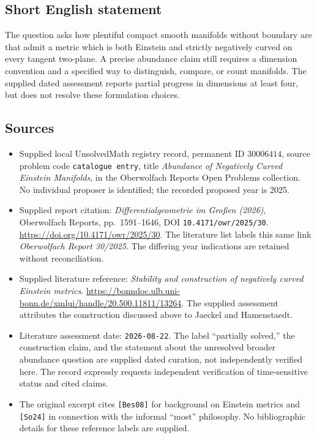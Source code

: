 \documentclass[11pt]{article}
\begin{document}
\subsection{Short English statement}
The question asks how plentiful compact smooth manifolds without boundary are that admit a metric which is both Einstein and strictly negatively curved on every tangent two-plane. A precise abundance claim still requires a dimension convention and a specified way to distinguish, compare, or count manifolds. The supplied dated assessment reports partial progress in dimensions at least four, but does not resolve these formulation choices.
\subsection{Sources}
\begin{itemize}
\item Supplied local UnsolvedMath registry record, permanent ID \(30006414\), source problem code \texttt{catalogue entry}, title \emph{Abundance of Negatively Curved Einstein Manifolds}, in the Oberwolfach Reports Open Problems collection. No individual proposer is identified; the recorded proposed year is 2025.
\item Supplied report citation: \emph{Differentialgeometrie im Großen (2026)}, Oberwolfach Reports, pp.\ 1591--1646, DOI \texttt{10.4171/owr/2025/30}. \url{https://doi.org/10.4171/owr/2025/30}. The literature list labels this same link \emph{Oberwolfach Report 30/2025}. The differing year indications are retained without reconciliation.
\item Supplied literature reference: \emph{Stability and construction of negatively curved Einstein metrics}. \url{https://bonndoc.ulb.uni-bonn.de/xmlui/handle/20.500.11811/13264}. The supplied assessment attributes the construction discussed above to Jaeckel and Hamenstaedt.
\item Literature assessment date: \texttt{2026-08-22}. The label ``partially solved,'' the construction claim, and the statement about the unresolved broader abundance question are supplied dated curation, not independently verified here. The record expressly requests independent verification of time-sensitive status and cited claims.
\item The original excerpt cites \texttt{[Bes08]} for background on Einstein metrics and \texttt{[So24]} in connection with the informal ``most'' philosophy. No bibliographic details for these reference labels are supplied.
\end{itemize}
\end{document}
